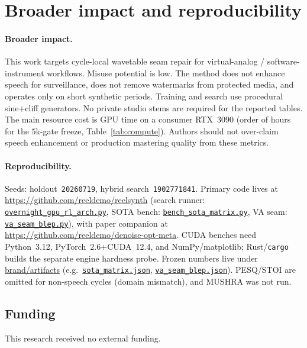 \section{Broader impact and reproducibility}
\label{sec:ethics}

\paragraph{Broader impact.}
This work targets cycle-local wavetable seam repair for virtual-analog / software-instrument workflows.
Misuse potential is low.
The method does not enhance speech for surveillance, does not remove watermarks from protected media, and operates only on short synthetic periods.
Training and search use procedural sine{+}cliff generators. No private studio stems are required for the reported tables.
The main resource cost is GPU time on a consumer RTX~3090 (order of hours for the $5$k-gate freeze, Table~\ref{tab:compute}).
Authors should not over-claim speech enhancement or production mastering quality from these metrics.

\paragraph{Reproducibility.}
Seeds: holdout~\texttt{20260719}, hybrid search~\texttt{1902771841}.
Primary code lives at \url{https://github.com/reeldemo/reelsynth}
(search runner:
\href{https://github.com/reeldemo/reelsynth/blob/main/scripts/overnight_gpu_rl_arch.py}{\texttt{overnight\_gpu\_rl\_arch.py}},
SOTA bench:
\href{https://github.com/reeldemo/reelsynth/blob/main/scripts/bench_sota_matrix.py}{\texttt{bench\_sota\_matrix.py}},
VA seam:
\href{https://github.com/reeldemo/reelsynth/blob/main/scripts/baselines/va_seam_blep.py}{\texttt{va\_seam\_blep.py}}),
with paper companion at \url{https://github.com/reeldemo/denoise-opt-meta}.
CUDA benches need Python~3.12, PyTorch~$2.6$+CUDA~12.4, and NumPy/matplotlib; Rust/\texttt{cargo} builds the separate engine hardness probe.
Frozen numbers live under
\href{https://github.com/reeldemo/reelsynth/tree/main/brand/artifacts}{brand/artifacts}
(e.g.\
\href{https://github.com/reeldemo/reelsynth/blob/main/brand/artifacts/sota_matrix.json}{\texttt{sota\_matrix.json}},
\href{https://github.com/reeldemo/reelsynth/blob/main/brand/artifacts/va_seam_blep.json}{\texttt{va\_seam\_blep.json}}).
PESQ/STOI are omitted for non-speech cycles (domain mismatch), and MUSHRA was not run.

\subsection{Funding}
\label{sec:funding}
This research received no external funding.


